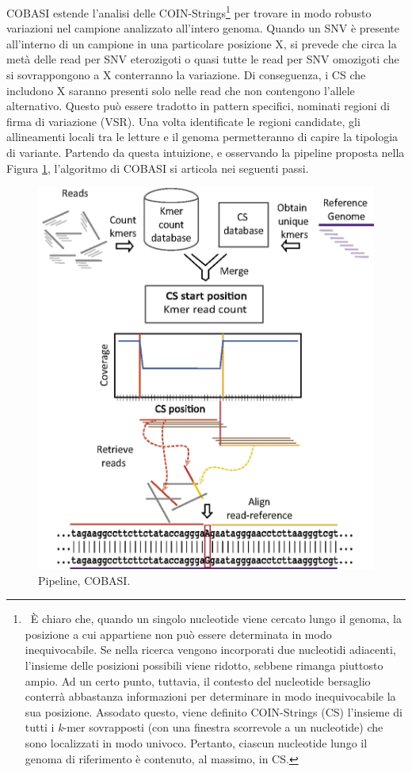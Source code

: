 \documentclass[../main.tex]{subfiles}
\begin{document}
COBASI estende l'analisi delle COIN-Strings\footnote{\ È chiaro che, quando un singolo nucleotide viene cercato lungo il genoma, la posizione a cui appartiene non può essere determinata in modo inequivocabile. Se nella ricerca vengono incorporati due nucleotidi adiacenti, l'insieme delle posizioni possibili viene ridotto, sebbene rimanga piuttosto ampio. Ad un certo punto, tuttavia, il contesto del nucleotide bersaglio conterrà abbastanza informazioni per determinare in modo inequivocabile la sua posizione. Assodato questo, viene definito COIN-Strings (CS) l'insieme di tutti i \textit{k}-mer sovrapposti (con una finestra scorrevole a un nucleotide) che sono localizzati in modo univoco. Pertanto, ciascun nucleotide lungo il genoma di riferimento è contenuto, al massimo, in CS.} per trovare in modo robusto variazioni nel campione analizzato all'intero genoma. Quando un SNV è presente all'interno di un campione in una particolare posizione X, si prevede che circa la metà delle read per SNV eterozigoti o quasi tutte le read per SNV omozigoti che si sovrappongono a X conterranno la variazione. Di conseguenza, i CS che includono X saranno presenti solo nelle read che non contengono l'allele alternativo. Questo può essere tradotto in pattern specifici, nominati regioni di firma di variazione (VSR). Una volta identificate le regioni candidate, gli allineamenti locali tra le letture e il genoma permetteranno di capire la tipologia di variante. Partendo da questa intuizione, e osservando la pipeline proposta nella Figura \ref{fig:cobasi}, l'algoritmo di COBASI si articola nei seguenti passi.

 \begin{figure}[h!]
	\centering
  	\captionsetup{justification=centering}
  	\includegraphics[scale=.20]{images/cobasi_pipeline.png}
  	\caption{Pipeline, COBASI.}
  	\label{fig:cobasi}
\end{figure}
\end{document}

